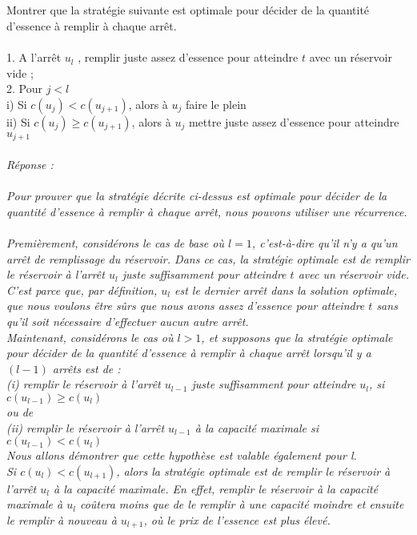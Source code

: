 \documentclass[a4paper,11pt]{article}
\begin{document}
	\subsection{}\label{subsec:Q8}
        Montrer que la stratégie suivante est optimale pour décider de la quantité d'essence à remplir à chaque arrêt.\\\\
1. A l’arrêt $u_l$ , remplir juste assez d’essence pour atteindre $t$ avec un réservoir vide ;\\
2. Pour $j < l$\\
i) Si $c(u_j) < c(u_{j+1})$, alors à $u_j$ faire le plein\\
ii) Si $c(u_j)\geq c(u_{j+1})$, alors à $u_j$ mettre juste assez d'essence pour atteindre $u_{j+1}$\\
            \\\textit{Réponse : \\\\  
            Pour prouver que la stratégie décrite ci-dessus est optimale pour décider de la quantité d'essence à remplir à chaque arrêt, nous pouvons utiliser une récurrence.\\\\
Premièrement, considérons le cas de base où $l = 1$, c'est-à-dire qu'il n'y a qu'un arrêt de remplissage du réservoir. Dans ce cas, la stratégie optimale est de remplir le réservoir à l'arrêt $u_l$ juste suffisamment pour atteindre $t$ avec un réservoir vide. C'est parce que, par définition, $u_l$ est le dernier arrêt dans la solution optimale, que nous voulons être sûrs que nous avons assez d'essence pour atteindre $t$ sans qu'il soit nécessaire d'effectuer aucun autre arrêt.\\
Maintenant, considérons le cas où $l > 1$, et supposons que la stratégie optimale pour décider de la quantité d'essence à remplir à chaque arrêt lorsqu'il y a $(l - 1)$ arrêts est de : \\
(i) remplir le réservoir à l'arrêt $u_{l - 1}$ juste suffisamment pour atteindre $u_l$, si $c(u_{l - 1}) \geq c(u_l)$\\
ou de\\
(ii) remplir le réservoir à l'arrêt $u_{l - 1}$ à la capacité maximale si $c(u_{l - 1}) < c(u_l)$\\
Nous allons démontrer que cette hypothèse est valable également pour l.\\
Si $c(u_l) < c(u_{l + 1})$, alors la stratégie optimale est de remplir le réservoir à l'arrêt $u_l$ à la capacité maximale. En effet, remplir le réservoir à la capacité maximale à $u_l$ coûtera moins que de le remplir à une capacité moindre et ensuite le remplir à nouveau à $u_{l + 1}$, où le prix de l'essence est plus élevé.\\
}
\end{document}
